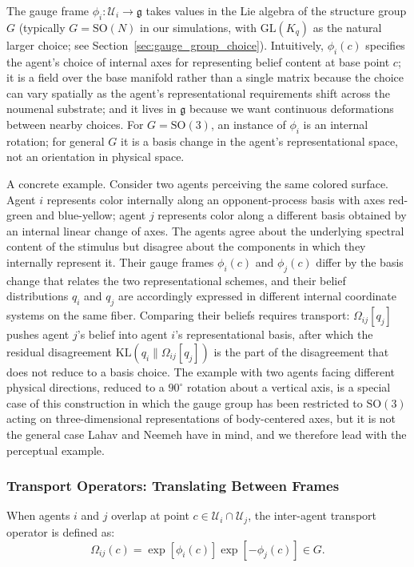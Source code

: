\documentclass[11pt]{article}
\begin{document}
The gauge frame $\phi_i: \mathcal{U}_i \to \mathfrak{g}$ takes values in the Lie algebra of the structure group $G$ (typically $G = \mathrm{SO}(N)$ in our simulations, with $\mathrm{GL}(K_q)$ as the natural larger choice; see Section~\ref{sec:gauge_group_choice}). Intuitively, $\phi_i(c)$ specifies the agent's choice of internal axes for representing belief content at base point $c$; it is a field over the base manifold rather than a single matrix because the choice can vary spatially as the agent's representational requirements shift across the noumenal substrate; and it lives in $\mathfrak{g}$ because we want continuous deformations between nearby choices. For $G = \mathrm{SO}(3)$, an instance of $\phi_i$ is an internal rotation; for general $G$ it is a basis change in the agent's representational space, not an orientation in physical space.

A concrete example. Consider two agents perceiving the same colored surface. Agent $i$ represents color internally along an opponent-process basis with axes red-green and blue-yellow; agent $j$ represents color along a different basis obtained by an internal linear change of axes. The agents agree about the underlying spectral content of the stimulus but disagree about the components in which they internally represent it. Their gauge frames $\phi_i(c)$ and $\phi_j(c)$ differ by the basis change that relates the two representational schemes, and their belief distributions $q_i$ and $q_j$ are accordingly expressed in different internal coordinate systems on the same fiber. Comparing their beliefs requires transport: $\Omega_{ij}[q_j]$ pushes agent $j$'s belief into agent $i$'s representational basis, after which the residual disagreement $\mathrm{KL}(q_i \|  \Omega_{ij}[q_j])$ is the part of the disagreement that does not reduce to a basis choice. The example with two agents facing different physical directions, reduced to a $90^\circ$ rotation about a vertical axis, is a special case of this construction in which the gauge group has been restricted to $\mathrm{SO}(3)$ acting on three-dimensional representations of body-centered axes, but it is not the general case Lahav and Neemeh have in mind, and we therefore lead with the perceptual example.

\subsubsection{Transport Operators: Translating Between Frames}
\label{sec:transport}

When agents $i$ and $j$ overlap at point $c \in \mathcal{U}_i \cap \mathcal{U}_j$, the inter-agent transport operator is defined as:
\begin{equation}
\Omega_{ij}(c) = \exp[\phi_i(c)] \exp[-\phi_j(c)] \in G.
\label{eq:transport_def}
\end{equation}
\end{document}
